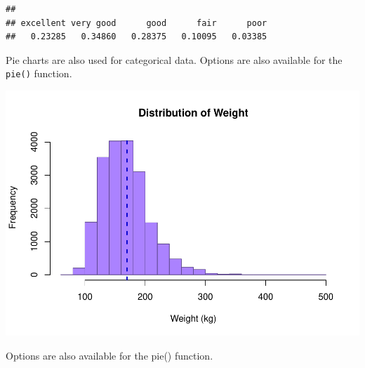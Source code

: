 \documentclass[
]{book}
\newenvironment{Shaded}{\begin{snugshade}}{\end{snugshade}}
\newcommand{\DataTypeTok}[1]{\textcolor[rgb]{0.13,0.29,0.53}{#1}}
\newcommand{\DecValTok}[1]{\textcolor[rgb]{0.00,0.00,0.81}{#1}}
\newcommand{\KeywordTok}[1]{\textcolor[rgb]{0.13,0.29,0.53}{\textbf{#1}}}
\newcommand{\NormalTok}[1]{#1}
\newcommand{\OperatorTok}[1]{\textcolor[rgb]{0.81,0.36,0.00}{\textbf{#1}}}
\newcommand{\StringTok}[1]{\textcolor[rgb]{0.31,0.60,0.02}{#1}}
\begin{document}
\begin{verbatim}
## 
## excellent very good      good      fair      poor 
##   0.23285   0.34860   0.28375   0.10095   0.03385
\end{verbatim}

Pie charts are also used for categorical data. Options are also available for the \texttt{pie()} function.

\begin{Shaded}
\end{Shaded}

\includegraphics{_main_files/figure-latex/unnamed-chunk-183-1.pdf}

Options are also available for the pie() function.

\begin{Shaded}
\end{Shaded}
\end{document}
